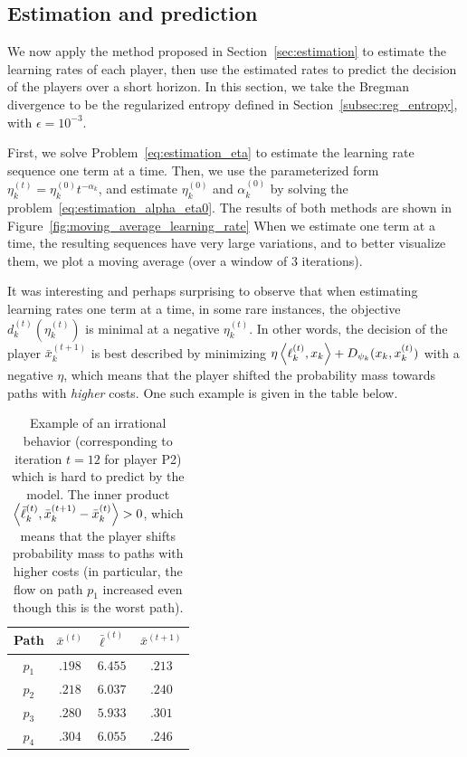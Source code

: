 \documentclass{sig-alternate-ipsn13}
\begin{document}
\subsection{Estimation and prediction}
We now apply the method proposed in Section~\ref{sec:estimation} to estimate the learning rates of each player, then use the estimated rates to predict the decision of the players over a short horizon. In this section, we take the Bregman divergence to be the regularized entropy defined in Section~\ref{subsec:reg_entropy}, with $\epsilon = 10^{-3}$.


First, we solve Problem~\eqref{eq:estimation_eta} to estimate the learning rate sequence one term at a time. Then, we use the parameterized form $\eta^{(t)}_k = \eta_k^{(0)} t^{-\alpha_k}$, and estimate $\eta_k^{(0)}$ and $\alpha_k^{(0)}$ by solving the problem~\ref{eq:estimation_alpha_eta0}. The results of both methods are shown in Figure~\eqref{fig:moving_average_learning_rate}
When we estimate one term at a time, the resulting sequences have very large variations, and to better visualize them, we plot a moving average (over a window of $3$ iterations).

It was interesting and perhaps surprising to observe that when estimating learning rates one term at a time, in some rare instances, the objective $d^{(t)}_k(\eta_k^{(t)})$ is minimal at a negative $\eta_k^{(t)}$. In other words, the decision of the player $\bar x^{(t+1)}_k$ is best described by minimizing $\eta \left\langle \ell^{(t)}_k, x_k \right\rangle + D_{\psi_k}(x_k, x^{(t)}_k)$ with a negative $\eta$, which means that the player shifted the probability mass towards paths with \emph{higher} costs. One such example is given in the table below.

\begin{table}
\centering
\begin{tabular}{|c|c|c|c|}
\hline
Path & $\bar x^{(t)}$ & $\bar \ell^{(t)}$ & $\bar x^{(t+1)}$ \\
\hline
$p_1$ & $.198$ & $6.455$ & $.213$ \\
\hline
$p_2$ & $.218$ & $6.037$ & $.240$ \\
\hline
$p_3$ & $.280$ & $5.933$ & $.301$ \\
\hline
$p_4$ & $.304$ & $6.055$ & $.246$ \\
\hline
\end{tabular}
\caption{\footnotesize Example of an irrational behavior (corresponding to iteration $t = 12$ for player P2) which is hard to predict by the model. The inner product $\left\langle \bar \ell_k^{(t)}, \bar x^{(t+1)}_k - \bar x^{(t)}_k \right\rangle > 0$, which means that the player shifts probability mass to paths with higher costs (in particular, the flow on path $p_1$ increased even though this is the worst path).}
\end{table}
\end{document}
